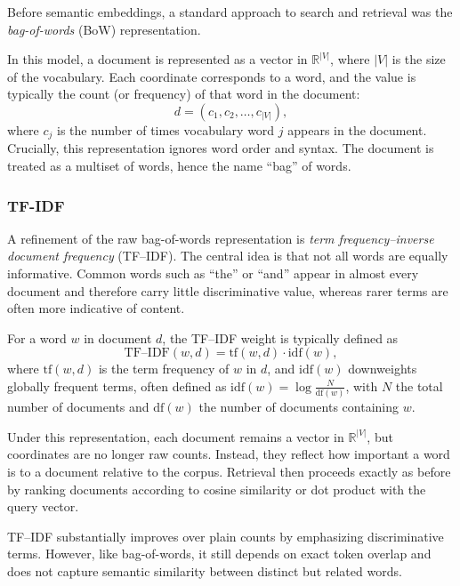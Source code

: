\medskip

Before semantic embeddings, a standard approach to search and retrieval was the \emph{bag-of-words} (BoW) representation.

In this model, a document is represented as a vector in $\mathbb{R}^{|V|}$, where $|V|$ is the size of the vocabulary. Each coordinate corresponds to a word, and the value is typically the count (or frequency) of that word in the document:
\[
d = (c_1, c_2, \dots, c_{|V|}),
\]
where $c_j$ is the number of times vocabulary word $j$ appears in the document. Crucially, this representation ignores word order and syntax. The document is treated as a multiset of words, hence the name ``bag'' of words.

\bigskip

\subsubsection{TF-IDF}

\medskip

A refinement of the raw bag-of-words representation is \emph{term frequency–inverse document frequency} (TF--IDF). The central idea is that not all words are equally informative. Common words such as ``the'' or ``and'' appear in almost every document and therefore carry little discriminative value, whereas rarer terms are often more indicative of content.

For a word $w$ in document $d$, the TF--IDF weight is typically defined as
\[
\text{TF--IDF}(w,d) = \text{tf}(w,d) \cdot \text{idf}(w),
\]
where $\text{tf}(w,d)$ is the term frequency of $w$ in $d$, and $\text{idf}(w)$ downweights globally frequent terms, often defined as $\text{idf}(w) = \log \frac{N}{\text{df}(w)}$, with $N$ the total number of documents and $\text{df}(w)$ the number of documents containing $w$.

Under this representation, each document remains a vector in $\mathbb{R}^{|V|}$, but coordinates are no longer raw counts. Instead, they reflect how important a word is to a document relative to the corpus. Retrieval then proceeds exactly as before by ranking documents according to cosine similarity or dot product with the query vector.

TF--IDF substantially improves over plain counts by emphasizing discriminative terms. However, like bag-of-words, it still depends on exact token overlap and does not capture semantic similarity between distinct but related words.


\medskip

